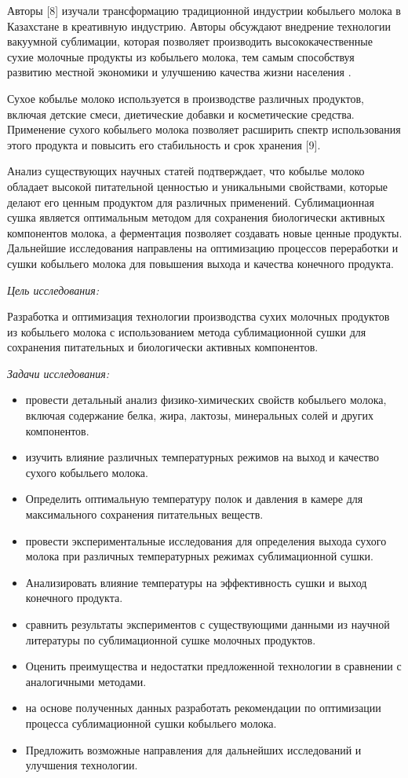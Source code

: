 Авторы {[}8{]} изучали трансформацию традиционной индустрии кобыльего
молока в Казахстане в креативную индустрию. Авторы обсуждают внедрение
технологии вакуумной сублимации, которая позволяет производить
высококачественные сухие молочные продукты из кобыльего молока, тем
самым способствуя развитию местной экономики и улучшению качества жизни
населения .

Сухое кобылье молоко используется в производстве различных продуктов,
включая детские смеси, диетические добавки и косметические средства.
Применение сухого кобыльего молока позволяет расширить спектр
использования этого продукта и повысить его стабильность и срок хранения
{[}9{]}.

Анализ существующих научных статей подтверждает, что кобылье молоко
обладает высокой питательной ценностью и уникальными свойствами, которые
делают его ценным продуктом для различных применений. Сублимационная
сушка является оптимальным методом для сохранения биологически активных
компонентов молока, а ферментация позволяет создавать новые ценные
продукты. Дальнейшие исследования направлены на оптимизацию процессов
переработки и сушки кобыльего молока для повышения выхода и качества
конечного продукта.

\emph{Цель исследования:}

Разработка и оптимизация технологии производства сухих молочных
продуктов из кобыльего молока с использованием метода сублимационной
сушки для сохранения питательных и биологически активных компонентов.

\emph{Задачи исследования:}

\begin{itemize}
\item
  провести детальный анализ физико-химических свойств кобыльего молока,
  включая содержание белка, жира, лактозы, минеральных солей и других
  компонентов.
\item
  изучить влияние различных температурных режимов на выход и качество
  сухого кобыльего молока.
\item
  Определить оптимальную температуру полок и давления в камере для
  максимального сохранения питательных веществ.
\item
  провести экспериментальные исследования для определения выхода сухого
  молока при различных температурных режимах сублимационной сушки.
\item
  Анализировать влияние температуры на эффективность сушки и выход
  конечного продукта.
\item
  сравнить результаты экспериментов с существующими данными из научной
  литературы по сублимационной сушке молочных продуктов.
\item
  Оценить преимущества и недостатки предложенной технологии в сравнении
  с аналогичными методами.
\item
  на основе полученных данных разработать рекомендации по оптимизации
  процесса сублимационной сушки кобыльего молока.
\item
  Предложить возможные направления для дальнейших исследований и
  улучшения технологии.
\end{itemize}

